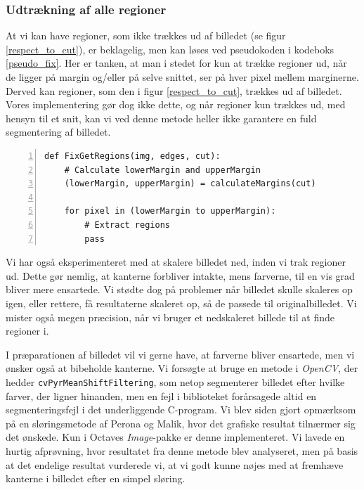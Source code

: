 {\subsubsection{Udtrækning af alle regioner}
At vi kan have regioner, som ikke trækkes ud af billedet (se figur
\ref{respect_to_cut}), er beklagelig, men kan løses ved pseudokoden i
kodeboks \ref{pseudo_fix}.  Her er tanken, at man i stedet for kun at
trække regioner ud, når de ligger på margin og/eller på selve snittet,
ser på hver pixel mellem marginerne. Derved kan regioner, som den i
figur \ref{respect_to_cut}, trækkes ud af billedet. Vores implementering
gør dog ikke dette, og når regioner kun trækkes ud, med hensyn til et
snit, kan vi ved denne metode heller ikke garantere en fuld segmentering
af billedet.

\begin{lstlisting}[caption={Pseudokode til udtrækning af regioner, der
    ligger inden for margin, men uden at krydse hverken nedre margin,
    øvre margin eller selve snittet.},
    captionpos=b,label={pseudo_fix},numbers=left, frame=tb,
    breaklines=false, float=h]
def FixGetRegions(img, edges, cut):
    # Calculate lowerMargin and upperMargin
    (lowerMargin, upperMargin) = calculateMargins(cut)

    for pixel in (lowerMargin to upperMargin):
        # Extract regions
        pass
\end{lstlisting}

Vi har også eksperimenteret med at skalere billedet ned, inden vi trak
regioner ud. Dette gør nemlig, at kanterne forbliver intakte, mens
farverne, til en vis grad bliver mere ensartede. Vi stødte dog på
problemer når billedet skulle skaleres op igen, eller rettere, få
resultaterne skaleret op, så de passede til originalbilledet. Vi mister
også megen præcision, når vi bruger et nedskaleret billede til at finde
regioner i.

I præparationen af billedet vil vi gerne have, at farverne bliver
ensartede, men vi ønsker også at bibeholde kanterne. Vi forsøgte at
bruge en metode i \emph{OpenCV}, der hedder
\texttt{cvPyrMeanShiftFiltering}, som netop segmenterer billedet efter
hvilke farver, der ligner hinanden, men en fejl i biblioteket
forårsagede altid en segmenteringsfejl i det underliggende C-program. Vi
blev siden gjort opmærksom på en sløringsmetode af Perona og
Malik\cite{perona1990scale}, hvor det grafiske resultat tilnærmer sig
det ønskede. Kun i Octaves \emph{Image}-pakke er denne implementeret. Vi
lavede en hurtig afprøvning, hvor resultatet fra denne metode blev
analyseret, men på basis at det endelige resultat vurderede vi, at vi
godt kunne nøjes med at fremhæve kanterne i billedet efter en simpel
sløring.

}
